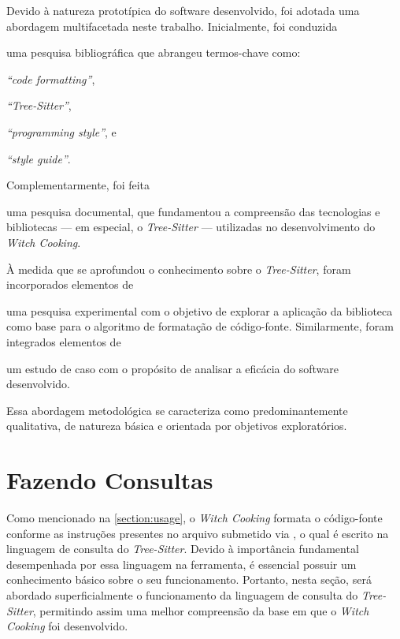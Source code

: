 \documentclass
  [11pt,a4paper,english,brazil,openright,sumario=tradicional,twoside]
  {abntex2}
\newcommand{\treesitter}{\textit{Tree-Sitter}\xspace}
\newcommand{\witchcooking}{\textit{Witch Cooking}\xspace}
\begin{document}
  Devido à natureza prototípica do software desenvolvido, foi adotada uma
  abordagem multifacetada neste trabalho. Inicialmente, foi conduzida
  \begin{inparaenum}
    \item uma pesquisa bibliográfica que abrangeu termos-chave como:
          \begin{inparaenum}
            \item \textit{``code formatting''},
            \item \textit{``Tree-Sitter''},
            \item \textit{``programming style''}, e
            \item \textit{``style guide''}.
          \end{inparaenum}
          Complementarmente, foi feita
    \item uma pesquisa documental, que fundamentou a compreensão das
          tecnologias e bibliotecas --- em especial, o \treesitter{} ---
          utilizadas no desenvolvimento do \witchcooking.

          À medida que se aprofundou o conhecimento sobre o \treesitter, foram
          incorporados elementos de
    \item uma pesquisa experimental com o objetivo de explorar a aplicação da
          biblioteca como base para o algoritmo de formatação de código-fonte.
          Similarmente, foram integrados elementos de
    \item um estudo de caso com o propósito de analisar a eficácia do software
          desenvolvido.
  \end{inparaenum}
  Essa abordagem metodológica se caracteriza como predominantemente
  qualitativa, de natureza básica e orientada por objetivos exploratórios.


  \section{Fazendo Consultas}

  Como mencionado na \cref{section:usage}, o \witchcooking formata o
  código-fonte conforme as instruções presentes no arquivo submetido via
  , o qual é escrito na linguagem de consulta do
  \treesitter. Devido à importância fundamental desempenhada por essa linguagem
  na ferramenta, é essencial possuir um conhecimento básico sobre o seu
  funcionamento. Portanto, nesta seção, será abordado superficialmente o
  funcionamento da linguagem de consulta do \treesitter, permitindo assim uma
  melhor compreensão da base em que o \witchcooking foi desenvolvido.
\end{document}
